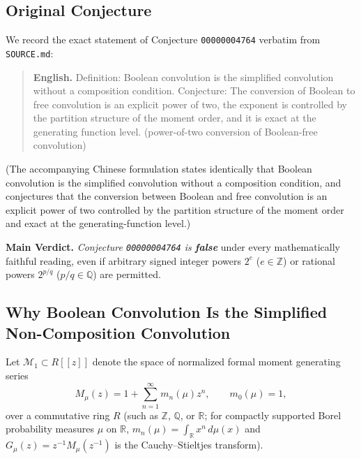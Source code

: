 \documentclass[11pt,a4paper]{article}
\theoremstyle{definition}
\theoremstyle{remark}
\begin{document}
\subsection{Original Conjecture}
We record the exact statement of Conjecture \texttt{00000004764} verbatim from \texttt{SOURCE.md}:
\begin{quote}
\textbf{English.} Definition: Boolean convolution is the simplified convolution without a composition condition. Conjecture: The conversion of Boolean to free convolution is an explicit power of two, the exponent is controlled by the partition structure of the moment order, and it is exact at the generating function level. (power-of-two conversion of Boolean-free convolution)
\end{quote}
(The accompanying Chinese formulation states identically that Boolean convolution is the simplified convolution without a composition condition, and conjectures that the conversion between Boolean and free convolution is an explicit power of two controlled by the partition structure of the moment order and exact at the generating-function level.)

\medskip
\noindent\textbf{Main Verdict.} \emph{Conjecture \texttt{00000004764} is \textbf{false}} under every mathematically faithful reading, even if arbitrary signed integer powers $2^e$ ($e \in \mathbb{Z}$) or rational powers $2^{p/q}$ ($p/q \in \mathbb{Q}$) are permitted.

\subsection{Why Boolean Convolution Is the Simplified Non-Composition Convolution}
Let $\mathcal{M}_1 \subset R[[z]]$ denote the space of normalized formal moment generating series
\[
  M_\mu(z) = 1 + \sum_{n=1}^{\infty} m_n(\mu) z^n, \qquad m_0(\mu) = 1,
\]
over a commutative ring $R$ (such as $\mathbb{Z}$, $\mathbb{Q}$, or $\mathbb{R}$; for compactly supported Borel probability measures $\mu$ on $\mathbb{R}$, $m_n(\mu) = \int_{\mathbb{R}} x^n \, d\mu(x)$ and $G_\mu(z) = z^{-1} M_\mu(z^{-1})$ is the Cauchy--Stieltjes transform).
\end{document}
